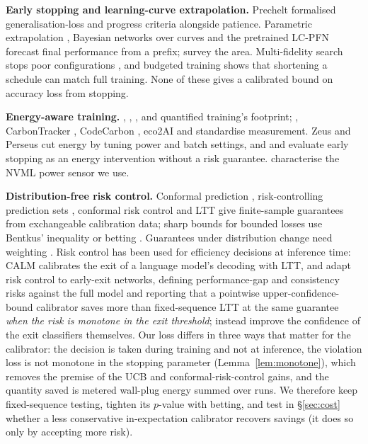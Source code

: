 \documentclass[3p,twocolumn,10pt]{elsarticle}
\theoremstyle{definition}
\begin{document}
\textbf{Early stopping and learning-curve extrapolation.} Prechelt \citep{prechelt1998early} formalised generalisation-loss and progress criteria alongside patience. Parametric extrapolation \citep{domhan2015speeding}, Bayesian networks over curves \citep{klein2017learningcurve} and the pretrained LC-PFN \citep{adriaensen2023lcpfn} forecast final performance from a prefix; \citet{mohr2022learningcurves} survey the area. Multi-fidelity search stops poor configurations \citep{jamieson2016nonstochastic,li2018hyperband,falkner2018bohb,swersky2014freezethaw}, and budgeted training \citep{li2020budgeted} shows that shortening a schedule can match full training. None of these gives a calibrated bound on accuracy loss from stopping.

\textbf{Energy-aware training.} \citet{strubell2019energy}, \citet{schwartz2020green}, \citet{lacoste2019carbon}, \citet{patterson2021carbon} and \citet{wu2022sustainableai} quantified training's footprint; \citet{henderson2020systematic}, CarbonTracker \citep{anthony2020carbontracker}, CodeCarbon \citep{schmidt2021codecarbon}, eco2AI \citep{budennyy2022eco2ai} and \citet{dodge2022cloudcarbon,luccioni2023bloom} standardise measurement. Zeus \citep{chung2023zeus} and Perseus \citep{chung2024perseus} cut energy by tuning power and batch settings, and \citet{reguero2025energy} and \citet{carbonaware2025} evaluate early stopping as an energy intervention without a risk guarantee. \citet{yang2024accurate} characterise the NVML power sensor we use.

\textbf{Distribution-free risk control.} Conformal prediction \citep{vovk2005algorithmic,angelopoulos2021gentle}, risk-controlling prediction sets \citep{bates2021rcps}, conformal risk control \citep{angelopoulos2024crc} and LTT \citep{angelopoulos2025ltt} give finite-sample guarantees from exchangeable calibration data; sharp bounds for bounded losses use Bentkus' inequality \citep{bentkus2004hoeffding} or betting \citep{waudbysmith2024betting}. Guarantees under distribution change need weighting \citep{tibshirani2019covariateshift}. Risk control has been used for efficiency decisions at inference time: CALM \citep{schuster2022calm} calibrates the exit of a language model's decoding with LTT, and \citet{jazbec2024fastsafe} adapt risk control to early-exit networks, defining performance-gap and consistency risks against the full model and reporting that a pointwise upper-confidence-bound calibrator saves more than fixed-sequence LTT at the same guarantee \emph{when the risk is monotone in the exit threshold}; \citet{kubaty2025rethinking} instead improve the confidence of the exit classifiers themselves. Our loss differs in three ways that matter for the calibrator: the decision is taken during training and not at inference, the violation loss is not monotone in the stopping parameter (Lemma~\ref{lem:monotone}), which removes the premise of the UCB and conformal-risk-control gains, and the quantity saved is metered wall-plug energy summed over runs. We therefore keep fixed-sequence testing, tighten its $p$-value with betting, and test in \S\ref{sec:cost} whether a less conservative in-expectation calibrator recovers savings (it does so only by accepting more risk).
\end{document}
